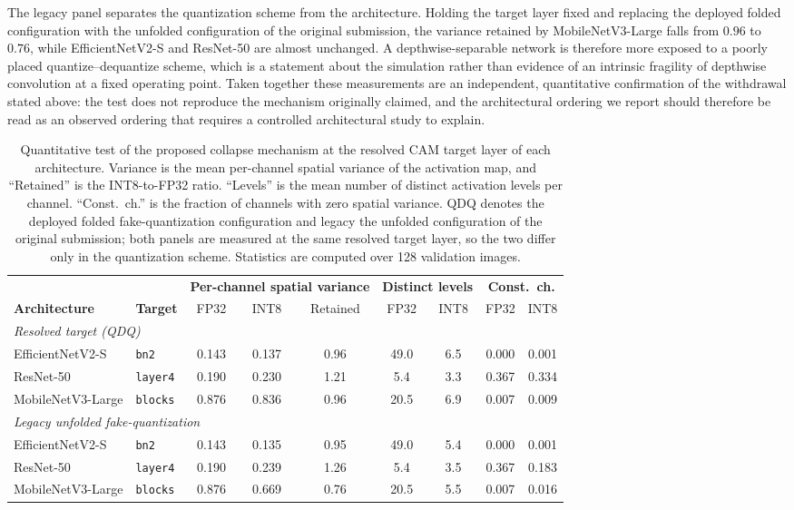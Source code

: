 \documentclass[fleqn,10pt]{wlscirep}
\begin{document}
The legacy panel separates the quantization scheme from the architecture. Holding the target layer fixed and replacing the deployed folded configuration with the unfolded configuration of the original submission, the variance retained by MobileNetV3-Large falls from $0.96$ to $0.76$, while EfficientNetV2-S and ResNet-50 are almost unchanged. A depthwise-separable network is therefore more exposed to a poorly placed quantize--dequantize scheme, which is a statement about the simulation rather than evidence of an intrinsic fragility of depthwise convolution at a fixed operating point. Taken together these measurements are an independent, quantitative confirmation of the withdrawal stated above: the test does not reproduce the mechanism originally claimed, and the architectural ordering we report should therefore be read as an observed ordering that requires a controlled architectural study to explain.

\begin{table}[htbp]
\centering
\caption{Quantitative test of the proposed collapse mechanism at the resolved CAM target layer of each architecture. Variance is the mean per-channel spatial variance of the activation map, and ``Retained'' is the INT8-to-FP32 ratio. ``Levels'' is the mean number of distinct activation levels per channel. ``Const.\ ch.'' is the fraction of channels with zero spatial variance. QDQ denotes the deployed folded fake-quantization configuration and legacy the unfolded configuration of the original submission; both panels are measured at the same resolved target layer, so the two differ only in the quantization scheme. Statistics are computed over 128 validation images.}
\label{tab:mechanism}
\small
\begin{tabular}{llccccccc}
\toprule
 & & \multicolumn{3}{c}{\textbf{Per-channel spatial variance}} & \multicolumn{2}{c}{\textbf{Distinct levels}} & \multicolumn{2}{c}{\textbf{Const.\ ch.}} \\
\cmidrule(lr){3-5}\cmidrule(lr){6-7}\cmidrule(lr){8-9}
\textbf{Architecture} & \textbf{Target} & FP32 & INT8 & Retained & FP32 & INT8 & FP32 & INT8 \\
\midrule
\multicolumn{9}{l}{\emph{Resolved target (QDQ)}} \\
EfficientNetV2-S  & \texttt{bn2}    & 0.143 & 0.137 & 0.96 & 49.0 & 6.5 & 0.000 & 0.001 \\
ResNet-50         & \texttt{layer4} & 0.190 & 0.230 & 1.21 &  5.4 & 3.3 & 0.367 & 0.334 \\
MobileNetV3-Large & \texttt{blocks} & 0.876 & 0.836 & 0.96 & 20.5 & 6.9 & 0.007 & 0.009 \\
\midrule
\multicolumn{9}{l}{\emph{Legacy unfolded fake-quantization}} \\
EfficientNetV2-S  & \texttt{bn2}    & 0.143 & 0.135 & 0.95 & 49.0 & 5.4 & 0.000 & 0.001 \\
ResNet-50         & \texttt{layer4} & 0.190 & 0.239 & 1.26 &  5.4 & 3.5 & 0.367 & 0.183 \\
MobileNetV3-Large & \texttt{blocks} & 0.876 & 0.669 & 0.76 & 20.5 & 5.5 & 0.007 & 0.016 \\
\bottomrule
\end{tabular}
\end{table}
\end{document}
